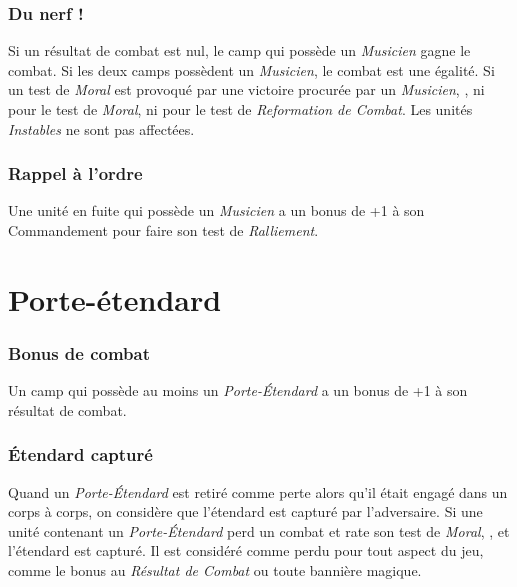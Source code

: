 \subsubsection*{Du nerf !}

Si un résultat de combat est nul, le camp qui possède un \emph{Musicien} gagne le combat. Si les deux camps possèdent un \emph{Musicien}, le combat est une égalité. Si un test de \emph{Moral} est provoqué par une victoire procurée par un \emph{Musicien}, , ni pour le test de \emph{Moral}, ni pour le test de \emph{Reformation de Combat}. Les unités \emph{Instables} ne sont pas affectées.

\subsubsection*{Rappel à l'ordre}

Une unité en fuite qui possède un \emph{Musicien} a un bonus de +1 à son Commandement pour faire son test de \emph{Ralliement}.

\section{Porte-étendard}

\subsubsection*{Bonus de combat}

Un camp qui possède au moins un \emph{Porte-Étendard} a un bonus de +1 à son résultat de combat.

\subsubsection*{Étendard capturé}

Quand un \emph{Porte-Étendard} est retiré comme perte alors qu'il était engagé dans un corps à corps, on considère que l'étendard est capturé par l'adversaire. Si une unité contenant un \emph{Porte-Étendard} perd un combat et rate son test de \emph{Moral}, , et l'étendard est capturé. Il est considéré comme perdu pour tout aspect du jeu, comme le bonus au \emph{Résultat de Combat} ou toute bannière magique.

\subsection{}

